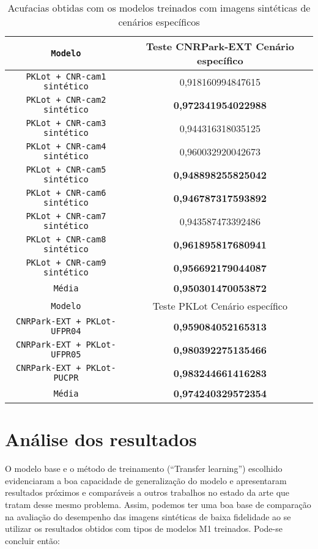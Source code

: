 \begin{table}[!htp] \footnotesize
    \centering
    \caption{Acuŕacias obtidas com os modelos treinados com imagens sintéticas de cenários específicos}
    \label{tab:tabela-resultados-3}
    \begin{tabular}{cc}
    \texttt{Modelo}& Teste CNRPark-EXT Cenário específico \\
    \hline
    \texttt{PKLot + CNR-cam1 sintético} & 0,918160994847615 \\
    \hline
    \texttt{PKLot + CNR-cam2 sintético} & \textbf{0,972341954022988} \\
    \hline
    \texttt{PKLot + CNR-cam3 sintético} & 0,944316318035125 \\
    \hline
    \texttt{PKLot + CNR-cam4 sintético} & 0,960032920042673 \\
    \hline
    \texttt{PKLot + CNR-cam5 sintético} & \textbf{0,948898255825042} \\
    \hline
    \texttt{PKLot + CNR-cam6 sintético} & \textbf{0,946787317593892} \\
    \hline
    \texttt{PKLot + CNR-cam7 sintético} & 0,943587473392486 \\
    \hline
    \texttt{PKLot + CNR-cam8 sintético} & \textbf{0,961895817680941} \\
    \hline
    \texttt{PKLot + CNR-cam9 sintético} & \textbf{0,956692179044087} \\
    \hline
    \texttt{Média} & \textbf{0,950301470053872} \\
    \hline
    \hline
    \texttt{Modelo}& Teste PKLot Cenário específico \\
    \hline
    \texttt{CNRPark-EXT + PKLot-UFPR04} & \textbf{0,959084052165313} \\
    \hline
    \texttt{CNRPark-EXT + PKLot-UFPR05} & \textbf{0,980392275135466} \\
    \hline
    \texttt{CNRPark-EXT + PKLot-PUCPR} & \textbf{0,983244661416283} \\
    \hline
    \texttt{Média} & \textbf{0,974240329572354} \\
    \hline
    \end{tabular}
\end{table}

\section{Análise dos resultados}

O modelo base e o método de treinamento (“Transfer learning”) escolhido evidenciaram a boa capacidade de generalização do modelo e apresentaram resultados próximos e comparáveis a outros trabalhos no estado da arte que tratam desse mesmo problema. Assim, podemos ter uma boa base de comparação na avaliação do desempenho das imagens sintéticas de baixa fidelidade ao se utilizar os resultados obtidos com tipos de modelos M1 treinados. Pode-se concluir então:

